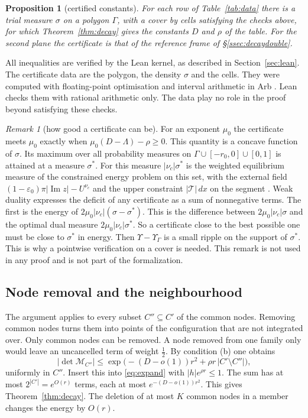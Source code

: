 \documentclass[11pt]{amsart}
\newtheorem{proposition}[theorem]{Proposition}
\theoremstyle{definition}
\theoremstyle{remark}
\newtheorem{remark}[theorem]{Remark}
\numberwithin{equation}{section}
\renewcommand{\Im}{\operatorname{Im}}
\begin{document}
\begin{proposition}[certified constants]\label{prop:cert}
For each row of Table~\ref{tab:data} there is a trial measure $\sigma$ on a polygon $\Gamma$, with a cover by cells
satisfying the checks above, for which Theorem~\ref{thm:decay} gives the constants $D$ and $\rho$ of the table. For the
second plane the certificate is that of the reference frame of \S\ref{ssec:decaydouble}.
\end{proposition}

All inequalities are verified by the Lean kernel, as described in Section~\ref{sec:lean}. The certificate data are the
polygon, the density $\sigma$ and the cells. They were computed with floating-point optimisation and interval arithmetic
in Arb \cite{Arb}. Lean checks them with rational arithmetic only. The data play no role in the proof beyond satisfying these
checks.

\begin{remark}[how good a certificate can be]\label{rem:certlimit}
For an exponent $\mu_0$ the certificate meets $\mu_0$ exactly when $\mu_0(D-\Lambda)-\rho\ge0$. This quantity is a concave function
of $\sigma$. Its maximum over all probability measures on $\Gamma\cup[-r_0,0]\cup[0,1]$ is attained at a measure
$\sigma^*$. For this measure $|\nu_c|\sigma^*$ is the weighted equilibrium measure of the constrained energy problem on
this set, with the external field $(1-\varepsilon_0)\pi|\Im z|-U^{\nu_c}$ and the upper constraint $|\mathcal T|\,dx$ on
the segment \cite{SaffTotik}. Weak duality expresses the deficit of any certificate as a sum of nonnegative terms. The
first is the energy of $2\mu_0|\nu_c|(\sigma-\sigma^*)$. This is the difference between $2\mu_0|\nu_c|\sigma$ and the optimal
dual measure $2\mu_0|\nu_c|\sigma^*$. So a certificate close to the best possible one must be close to $\sigma^*$ in energy.
Then $\Upsilon-\Upsilon_\Gamma$ is a small ripple on the support of $\sigma^*$. This is why a pointwise verification on a
cover is needed. This remark is not used in any proof and is not part of the formalization.
\end{remark}

\subsection{Node removal and the neighbourhood}
The argument applies to every subset $C''\subseteq C'$ of the common nodes. Removing common nodes turns them into points
of the configuration that are not integrated over. Only common nodes can be removed. A node removed from one family only
would leave an uncancelled term of weight $\frac12$. By condition (b) one obtains
\[
 |\det\mathcal M_{C''}|\le\exp\bigl(-(D-o(1))r^2+\rho r\,|C'\setminus C''|\bigr),
\]
uniformly in $C''$. Insert this into \eqref{eq:expand} with $|h|e^{\rho r}\le1$. The sum has at most
$2^{|C'|}=e^{O(r)}$ terms, each at most $e^{-(D-o(1))r^2}$. This gives Theorem~\ref{thm:decay}. The deletion of at most
$K$ common nodes in a member changes the energy by $O(r)$.
\end{document}
